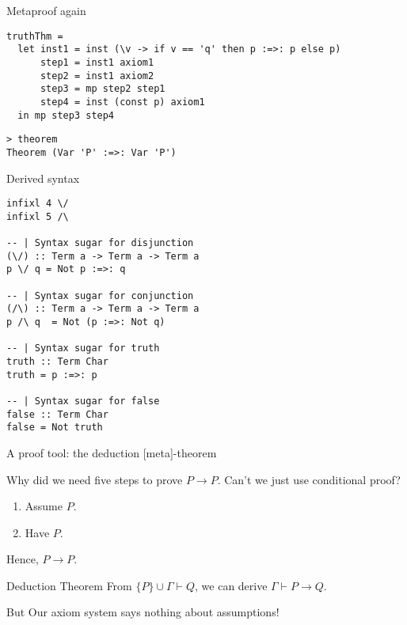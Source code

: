 \documentclass[presentation]{beamer}
\begin{document}
\begin{frame}[fragile,label={sec:orgheadline12}]{Metaproof again}
 \begin{block}{}
\begin{verbatim}
truthThm =
  let inst1 = inst (\v -> if v == 'q' then p :=>: p else p)
      step1 = inst1 axiom1
      step2 = inst1 axiom2
      step3 = mp step2 step1
      step4 = inst (const p) axiom1
  in mp step3 step4
\end{verbatim}
\end{block}

\begin{block}{}
\begin{verbatim}
> theorem
Theorem (Var 'P' :=>: Var 'P')
\end{verbatim}
\end{block}
\end{frame}

\begin{frame}[fragile,label={sec:orgheadline13}]{Derived syntax}
 \small
\begin{verbatim}
infixl 4 \/
infixl 5 /\

-- | Syntax sugar for disjunction
(\/) :: Term a -> Term a -> Term a
p \/ q = Not p :=>: q

-- | Syntax sugar for conjunction
(/\) :: Term a -> Term a -> Term a
p /\ q  = Not (p :=>: Not q)

-- | Syntax sugar for truth
truth :: Term Char
truth = p :=>: p

-- | Syntax sugar for false
false :: Term Char
false = Not truth
\end{verbatim}
\end{frame}

\begin{frame}[label={sec:orgheadline14}]{A proof tool: the deduction [meta]-theorem}
\begin{block}{}
Why did we need five steps to prove \(P \rightarrow P\). Can't we just use
conditional proof?

\begin{enumerate}
\item Assume \(P\).
\item Have \(P\).
\end{enumerate}

Hence, \(P \rightarrow P\).
\end{block}

\begin{block}{Deduction Theorem}
From \(\{P\} \cup \Gamma \vdash Q\), we can derive \(\Gamma \vdash P \rightarrow Q\).
\end{block}

\begin{block}{}
But Our axiom system says nothing about assumptions!
\end{block}
\end{frame}
\end{document}
